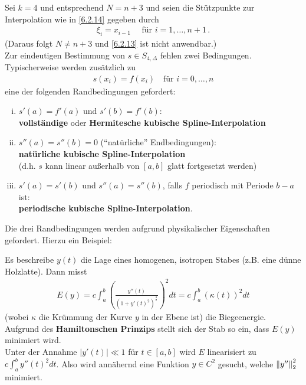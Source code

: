  \label{6.2.15}
Sei $k=4$ und entsprechend $N=n+3$ und 
seien die Stützpunkte zur Interpolation wie in \ref{6.2.14}
gegeben durch 
\begin{gather*}
  \xi_i = x_{i-1} \quad \text{ für } i=1, \ldots, n+1\,.
\end{gather*}
(Daraus folgt $N\neq n+3$ und \ref{6.2.13} ist nicht anwendbar.)\\
Zur eindeutigen Bestimmung von $s\in S_{4,\Delta}$ fehlen zwei
Bedingungen.\\
Typischerweise werden 
zusätzlich zu 
\begin{gather*}
  s(x_i)=f(x_i) \quad \text{für } i=0,\ldots,n
\end{gather*} 
eine der folgenden Randbedingungen gefordert:
\begin{enumerate}[i)]
\item $s'(a)=f'(a)$ und $s'(b)=f'(b)$:  \\
  \textbf{vollständige} oder \textbf{Hermitesche kubische 
    Spline-Interpolation} 
\item $s''(a)=s''(b)=0$ (\enquote{natürliche}  Endbedingungen):\\
  \textbf{natürliche kubische Spline-Interpolation}\\
  (d.h. $s$ kann linear außerhalb von $[a,b]$ glatt fortgesetzt
  werden) 
\item $s'(a)=s'(b)$ und $s''(a)=s''(b)$,
  falls $f$ periodisch mit Periode $b-a$ ist: \\
  \textbf{periodische kubische Spline-Interpolation}.
\end{enumerate}
Die drei Randbedingungen werden aufgrund physikalischer
Eigenschaften gefordert. Hierzu ein Beispiel: 

Es beschreibe $y(t)$ die Lage eines
homogenen, isotropen Stabes (z.B. eine dünne Holzlatte).
Dann misst
\begin{gather*}
  E(y) = c \int_a^b\left(
    \frac{y''(t)}{(1+y'(t)^2)^{\frac{3}{2}}}
  \right)^2dt
  = c \int_a^b\left(
    \kappa(t)
  \right)^2dt
\end{gather*}
(wobei $\kappa $ die Krümmung der Kurve $y$ in der Ebene ist) 
die Biegeenergie.\\
Aufgrund des \textbf{Hamiltonschen Prinzips}
stellt sich der Stab so ein, dass $E(y)$ minimiert wird.\\
Unter der Annahme $|y'(t)| \ll 1$ für $t\in [a,b]$ 
wird $E$ linearisiert zu $c\int_a^by''(t)^2dt$.
Also wird annähernd eine Funktion $y\in C^2$ gesucht,
welche $\left\| y'' \right\|_2^2$ minimiert.

